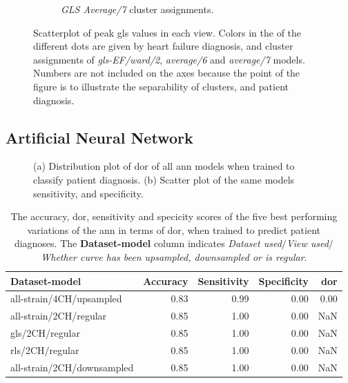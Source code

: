 \begin{figure}[H]
\begin{subfigure}[b]{0.49\textwidth}
        \caption{\textit{GLS Average/7} cluster assignments.}
        \label{fig:scatter_gls_average7}
    \end{subfigure}
    \caption{Scatterplot of peak \acrshort{gls} values in each view. Colors in the of the different dots are given by heart failure diagnosis, and cluster assignments of 
             \textit{gls-EF/ward/2}, \textit{average/6} and \textit{average/7} models. Numbers are not included on the axes because the point of the figure is to illustrate the separability 
             of clusters, and patient diagnosis.}
             \label{fig:scatter_gls_ind_cluster_assignments}
\end{figure}

\newpage

\subsection{Artificial Neural Network}

\begin{figure}[H]
    \centering
    
    \caption{(a) Distribution plot of \acrshort{dor} of all \acrshort{ann} models when trained to classify patient diagnosis.
             (b) Scatter plot of the same models sensitivity, and specificity.}
    \label{fig:dl_ind_dor_sens_spec_dist}
\end{figure}

\begin{table}
    \centering
    \begin{tabular}{lrrrr}
        \toprule
        Dataset-model              &  Accuracy &  Sensitivity &  Specificity &  \acrshort{dor} \\
        \midrule
        all-strain/4CH/upsampled   &      0.83 &         0.99 &         0.00 & 0.00 \\
        all-strain/2CH/regular     &      0.85 &         1.00 &         0.00 &  NaN \\
        gls/2CH/regular            &      0.85 &         1.00 &         0.00 &  NaN \\
        rls/2CH/regular            &      0.85 &         1.00 &         0.00 &  NaN \\
        all-strain/2CH/downsampled &      0.85 &         1.00 &         0.00 &  NaN \\
        \bottomrule
    \end{tabular}
    \caption{The accuracy, \acrshort{dor}, sensitivity and specicity scores of the five best performing variations of the \acrshort{ann} in terms of \acrshort{dor}, when trained to predict patient diagnoses.
             The \textbf{Dataset-model} column indicates \textit{Dataset used}$/$\textit{View used}$/$\textit{Whether curve has been upsampled, downsampled or is regular}.}
    \label{tab:dl_hf_dor_sens_spec_dist}
\end{table}

